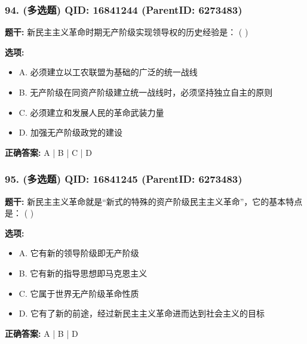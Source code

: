 \documentclass[12pt,UTF8]{ctexart}
\begin{document}
\subsubsection*{94. (多选题) \small QID: 16841244 (ParentID: 6273483)}

\textbf{题干:}
新民主主义革命时期无产阶级实现领导权的历史经验是： ( )



\textbf{选项:}
\begin{itemize}[leftmargin=*]

  \item A. 必须建立以工农联盟为基础的广泛的统一战线

  \item B. 无产阶级在同资产阶级建立统一战线时，必须坚持独立自主的原则

  \item C. 必须建立和发展人民的革命武装力量

  \item D. 加强无产阶级政党的建设

\end{itemize}

\textbf{正确答案:}
A | B | C | D

\vspace{0.3em}\hrulefill\vspace{0.7em}

\subsubsection*{95. (多选题) \small QID: 16841245 (ParentID: 6273483)}

\textbf{题干:}
新民主主义革命就是“新式的特殊的资产阶级民主主义革命”，它的基本特点是： ( )



\textbf{选项:}
\begin{itemize}[leftmargin=*]

  \item A. 它有新的领导阶级即无产阶级

  \item B. 它有新的指导思想即马克恩主义

  \item C. 它属于世界无产阶级革命性质

  \item D. 它有了新的前途，经过新民主主义革命进而达到社会主义的目标

\end{itemize}

\textbf{正确答案:}
A | B | D
\end{document}
